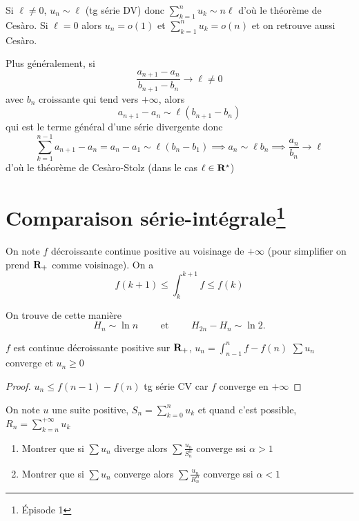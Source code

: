 \begin{rem}
    Si $\ell\neq 0$, $u_n\sim \ell$ (tg série DV) donc $\sum_{k=1}^nu_k\sim n\ell$ d'où le théorème de Cesàro. Si $\ell=0$ alors $u_n=o(1)$ et $\sum_{k=1}^nu_k=o(n)$ et on retrouve aussi Cesàro.

    Plus généralement, si \[
        \frac{a_{n+1}-a_n}{b_{n+1}-b_n}\longrightarrow\ell\neq 0
    \]
    avec $b_n$ croissante qui tend vers $+\infty$, alors \[
        a_{n+1}-a_n\sim \ell (b_{n+1}-b_n)
    \]
    qui est le terme général d'une série divergente donc \[
        \sum_{k=1}^{n-1}a_{n+1}-a_n=a_n-a_1\sim \ell (b_n-b_1) \implies a_n\sim \ell b_n\implies \frac{a_n}{b_n}\longrightarrow \ell
    \]
    d'où le théorème de Cesàro-Stolz (dans le cas $\ell\in\mathbf R^\star$)
\end{rem}

\section{Comparaison série-intégrale\texorpdfstring{\footnote{Épisode 1}}{}}

On note $f$ décroissante continue positive au voisinage de $+\infty$ (pour simplifier on prend $\mathbf R_+$ comme voisinage). On a \[
    f(k+1)\leq \int_k^{k+1}f\leq f(k)
\]

\begin{ex}
    On trouve de cette manière \[
        H_n\sim\ln n\qquad \text{ et }\qquad H_{2n}-H_n\sim \ln 2.
    \]
\end{ex}

\begin{thm}
    \Hyp $f$ est continue décroissante positive sur $\mathbf R_+$, $u_n=\displaystyle\int_{n-1}^n f-f(n)$
    \Conc $\sum u_n$ converge et $u_n\geq 0$
\end{thm}

\begin{proof}
    $u_n\leq f(n-1)-f(n)$ tg série CV car $f$ converge en $+\infty$
\end{proof}

\begin{exo}
    On note $u$ une suite positive, $S_n=\sum_{k=0}^nu_k$ et quand c'est possible, $R_n=\sum_{k=n}^{+\infty}u_k$
    \begin{enumerate}
        \item Montrer que si $\sum u_n$ diverge alors $\sum \frac{u_n}{S_n^\alpha}$ converge ssi $\alpha>1$
        \item Montrer que si $\sum u_n$ converge alors $\sum \frac{u_n}{R_n^\alpha}$ converge ssi $\alpha<1$
    \end{enumerate}
\end{exo}

